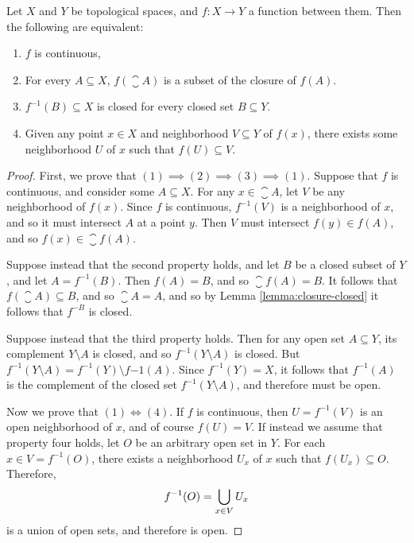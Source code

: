 \begin{thm} Let $X$ and $Y$ be topological spaces, and $f: X \to Y$ a function between them. Then the following are equivalent:
    \begin{enumerate}[label=(\arabic*)]
        \item $f$ is continuous,
        \item For every $A \subseteq X$, $f(\closure{A})$ is a subset of the closure of $f(A)$.
        \item $f^{-1}(B) \subseteq X$ is closed for every closed set $B \subseteq Y$.
        \item Given any point $x \in X$ and neighborhood $V \subseteq Y$ of $f(x)$, there exists some neighborhood $U$ of $x$ such that $f(U) \subseteq V$.
    \end{enumerate}
\end{thm}

\begin{proof}
    First, we prove that $(1) \implies (2) \implies (3) \implies (1)$. Suppose that $f$ is continuous, and consider some $A \subseteq X$. For any $x \in \closure{A}$, let $V$ be any neighborhood of $f(x)$. Since $f$ is continuous, $f^{-1}(V)$ is a neighborhood of $x$, and so it must intersect $A$ at a point $y$. Then $V$ must intersect $f(y) \in f(A)$, and so $f(x) \in \closure{f(A)}$.

    Suppose instead that the second property holds, and let $B$ be a closed subset of $Y$, and let $A = f^{-1}(B)$. Then $f(A) = B$, and so $\closure{f(A)} = B$. It follows that $f(\closure{A}) \subseteq B$, and so $\closure{A} = A$, and so by Lemma \ref{lemma:closure-closed} it follows that $f^{-B}$ is closed.

    Suppose instead that the third property holds. Then for any open set $A \subseteq Y$, its complement $Y \setminus A$ is closed, and so $f^{-1}(Y \setminus A)$ is closed. But $f^{-1}(Y \setminus A) = f^{-1}(Y) \setminus f{-1}(A)$. Since $f^{-1}(Y) = X$, it follows that $f^{-1}(A)$ is the complement of the closed set $f^{-1}(Y \setminus A)$, and therefore must be open.

    Now we prove that $(1) \iff (4)$. If $f$ is continuous, then $U = f^{-1}(V)$ is an open neighborhood of $x$, and of course $f(U) = V$. If instead we assume that property four holds, let $O$ be an arbitrary open set in $Y$. For each $x \in V = f^{-1}(O)$, there exists a neighborhood $U_x$ of $x$ such that $f(U_x) \subseteq O$. Therefore,
    \begin{align*}
        f^{-1}(O) = \bigcup_{x \in V}U_x
    \end{align*}
    is a union of open sets, and therefore is open.
\end{proof}

